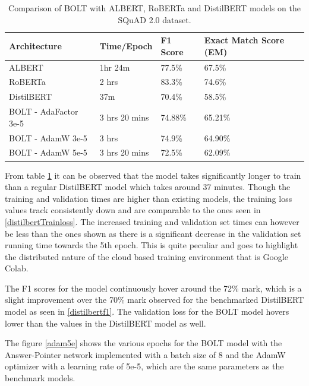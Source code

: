 \documentclass[a4paper,12pt]{report}
\begin{document}
\begin{table}[h!]
	\centering
	\begin{tabular}{|l|l|l|l|}
		\hline
		Architecture & Time/Epoch &  F1 Score & Exact Match Score (EM)\\
		\hline
		ALBERT & 1hr 24m &  77.5\% &  67.5\% \\
		RoBERTa & 2 hrs & 83.3\% & 74.6\% \\
		DistilBERT & 37m & 70.4\% & 58.5\%\\
		BOLT - AdaFactor 3e-5 & 3 hrs 20 mins & 74.88\% & 65.21\%\\
		BOLT - AdamW 3e-5 & 3 hrs & 74.9\% & 64.90\% \\
		BOLT - AdamW 5e-5 & 3 hrs 20 mins & 72.5\% & 62.09\% \\
		\hline
	\end{tabular}
	\caption{Comparison of  BOLT with ALBERT, RoBERTa and DistilBERT models on the SQuAD 2.0 dataset.}\label{boltResults}
\end{table}
	From table \ref{boltResults} it can be observed that the model takes significantly longer to train than a regular DistilBERT model which takes around 37 minutes. Though the training and validation times are higher than existing models, the training loss values track consistently down and are comparable to the ones seen in \ref{distilbertTrainloss}. The increased training and validation set times can however be less than the ones shown as there is a significant decrease in the validation set running time towards the 5th epoch. This is quite peculiar and goes to highlight the distributed nature of the cloud based training environment that is Google Colab.

	The F1 scores for the model continuously hover around the 72\% mark, which is a slight improvement over the 70\% mark observed for the benchmarked DistilBERT model as seen in \ref{distilbertf1}.
	The validation loss for the BOLT model hovers lower than the values in the DistilBERT model as well.

	The figure \ref{adam5e} shows the various epochs for the BOLT model with the Answer-Pointer network implemented with a batch size of 8 and the AdamW optimizer with a learning rate of 5e-5, which  are the same parameters as the benchmark models.
\end{document}
